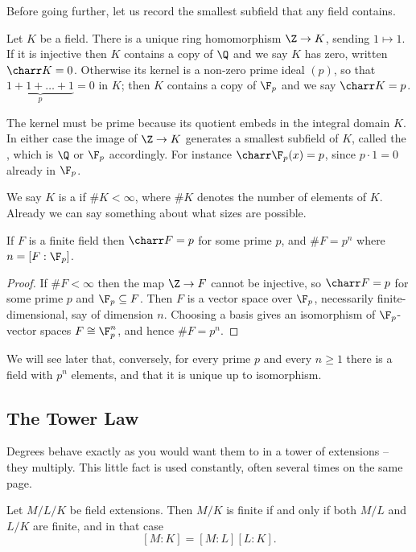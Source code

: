 Before going further, let us record the smallest subfield that any field contains.

\begin{definition}[Characteristic]
	Let $K$ be a field. There is a unique ring homomorphism $\Z \to K$, sending $1 \mapsto 1$. If it is injective then $K$ contains a copy of $\Q$ and we say $K$ has  zero, written $\charr K = 0$. Otherwise its kernel is a non-zero prime ideal $(p)$, so that $\underbrace{1 + 1 + \dots + 1}_{p} = 0$ in $K$; then $K$ contains a copy of $\F_p$ and we say $\charr K = p$.
\end{definition}

The kernel must be prime because its quotient embeds in the integral domain $K$. In either case the image of $\Z \to K$ generates a smallest subfield of $K$, called the , which is $\Q$ or $\F_p$ accordingly. For instance $\charr \F_p(x) = p$, since $p \cdot 1 = 0$ already in $\F_p$.

We say $K$ is a  if $\#K < \infty$, where $\#K$ denotes the number of elements of $K$. Already we can say something about what sizes are possible.

\begin{lemma}
	If $F$ is a finite field then $\charr F = p$ for some prime $p$, and $\#F = p^n$ where $n = [F : \F_p]$.
\end{lemma}

\begin{proof}
	If $\#F < \infty$ then the map $\Z \to F$ cannot be injective, so $\charr F = p$ for some prime $p$ and $\F_p \subseteq F$. Then $F$ is a vector space over $\F_p$, necessarily finite-dimensional, say of dimension $n$. Choosing a basis gives an isomorphism of $\F_p$-vector spaces $F \cong \F_p^n$, and hence $\#F = p^n$.
\end{proof}

We will see later that, conversely, for every prime $p$ and every $n \geq 1$ there is a field with $p^n$ elements, and that it is unique up to isomorphism.

\subsection{The Tower Law}

Degrees behave exactly as you would want them to in a tower of extensions -- they multiply. This little fact is used constantly, often several times on the same page.

\begin{theorem}
	Let $M/L/K$ be field extensions. Then $M/K$ is finite if and only if both $M/L$ and $L/K$ are finite, and in that case
	$$[M : K] = [M : L][L : K].$$
\end{theorem}

